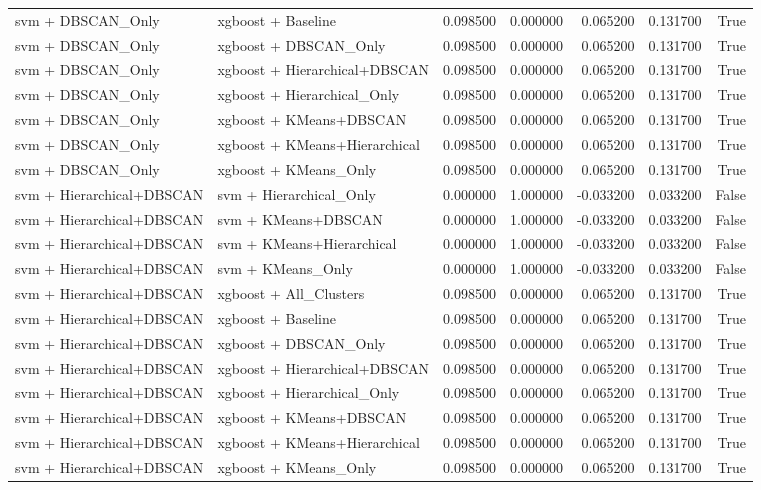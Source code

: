 \begin{tabular}{llrrrrr}
svm + DBSCAN_Only & xgboost + Baseline & 0.098500 & 0.000000 & 0.065200 & 0.131700 & True \\
svm + DBSCAN_Only & xgboost + DBSCAN_Only & 0.098500 & 0.000000 & 0.065200 & 0.131700 & True \\
svm + DBSCAN_Only & xgboost + Hierarchical+DBSCAN & 0.098500 & 0.000000 & 0.065200 & 0.131700 & True \\
svm + DBSCAN_Only & xgboost + Hierarchical_Only & 0.098500 & 0.000000 & 0.065200 & 0.131700 & True \\
svm + DBSCAN_Only & xgboost + KMeans+DBSCAN & 0.098500 & 0.000000 & 0.065200 & 0.131700 & True \\
svm + DBSCAN_Only & xgboost + KMeans+Hierarchical & 0.098500 & 0.000000 & 0.065200 & 0.131700 & True \\
svm + DBSCAN_Only & xgboost + KMeans_Only & 0.098500 & 0.000000 & 0.065200 & 0.131700 & True \\
svm + Hierarchical+DBSCAN & svm + Hierarchical_Only & 0.000000 & 1.000000 & -0.033200 & 0.033200 & False \\
svm + Hierarchical+DBSCAN & svm + KMeans+DBSCAN & 0.000000 & 1.000000 & -0.033200 & 0.033200 & False \\
svm + Hierarchical+DBSCAN & svm + KMeans+Hierarchical & 0.000000 & 1.000000 & -0.033200 & 0.033200 & False \\
svm + Hierarchical+DBSCAN & svm + KMeans_Only & 0.000000 & 1.000000 & -0.033200 & 0.033200 & False \\
svm + Hierarchical+DBSCAN & xgboost + All_Clusters & 0.098500 & 0.000000 & 0.065200 & 0.131700 & True \\
svm + Hierarchical+DBSCAN & xgboost + Baseline & 0.098500 & 0.000000 & 0.065200 & 0.131700 & True \\
svm + Hierarchical+DBSCAN & xgboost + DBSCAN_Only & 0.098500 & 0.000000 & 0.065200 & 0.131700 & True \\
svm + Hierarchical+DBSCAN & xgboost + Hierarchical+DBSCAN & 0.098500 & 0.000000 & 0.065200 & 0.131700 & True \\
svm + Hierarchical+DBSCAN & xgboost + Hierarchical_Only & 0.098500 & 0.000000 & 0.065200 & 0.131700 & True \\
svm + Hierarchical+DBSCAN & xgboost + KMeans+DBSCAN & 0.098500 & 0.000000 & 0.065200 & 0.131700 & True \\
svm + Hierarchical+DBSCAN & xgboost + KMeans+Hierarchical & 0.098500 & 0.000000 & 0.065200 & 0.131700 & True \\
svm + Hierarchical+DBSCAN & xgboost + KMeans_Only & 0.098500 & 0.000000 & 0.065200 & 0.131700 & True \\

\end{tabular}
